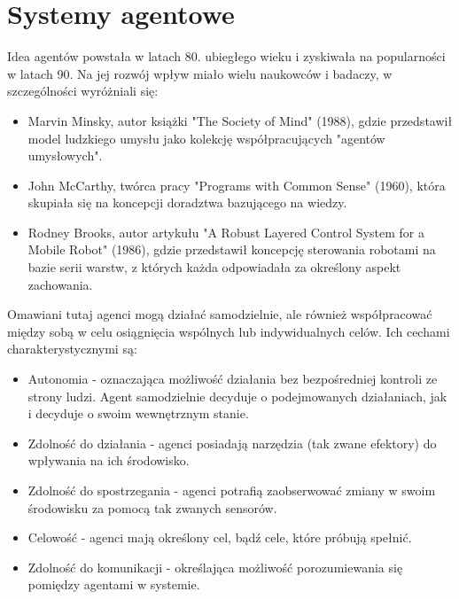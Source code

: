 \section{Systemy agentowe}

\par Idea agentów powstała w latach 80. ubiegłego wieku i zyskiwała na popularności w latach 90. Na jej rozwój wpływ miało wielu naukowców i badaczy, w szczególności wyróżniali się:

\begin{itemize}
    \item Marvin Minsky, autor książki "The Society of Mind" (1988)\cite{minsky1988society}, gdzie przedstawił model ludzkiego umysłu jako kolekcję współpracujących "agentów umysłowych".
    \item John McCarthy, twórca pracy "Programs with Common Sense" (1960)\cite{McCarthy1960ProgramsWC}, która skupiała się na koncepcji doradztwa bazującego na wiedzy.
    \item  Rodney Brooks, autor artykułu "A Robust Layered Control System for a Mobile Robot" (1986)\cite{1087032}, gdzie przedstawił koncepcję sterowania robotami na bazie serii warstw, z których każda odpowiadała za określony aspekt zachowania.
\end{itemize}

\par Omawiani tutaj agenci mogą działać samodzielnie, ale również współpracować między sobą w celu osiągnięcia wspólnych lub indywidualnych celów. Ich cechami charakterystycznymi są:
\begin{itemize}
    \item Autonomia - oznaczająca możliwość działania bez bezpośredniej kontroli ze strony ludzi. Agent samodzielnie decyduje o podejmowanych działaniach, jak i decyduje o swoim wewnętrznym stanie.
    \item Zdolność do działania - agenci posiadają narzędzia (tak zwane efektory) do wpływania na ich środowisko.
    \item Zdolność do spostrzegania - agenci potrafią zaobserwować zmiany w swoim środowisku za pomocą tak zwanych sensorów.
    \item Celowość - agenci mają określony cel, bądź cele, które próbują spełnić.
    \item Zdolność do komunikacji - określająca możliwość porozumiewania się pomiędzy agentami w systemie.
\end{itemize}

